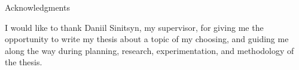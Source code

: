 \thispagestyle{empty}

\vspace*{20mm}

\begin{center}
    { Acknowledgments}
\end{center}

\vspace{10mm}

I would like to thank Daniil Sinitsyn, my supervisor, for giving me the opportunity to write my thesis about a topic of my choosing, and guiding me along the way during planning, research, experimentation, and methodology of the thesis. 
\cleardoublepage{}
